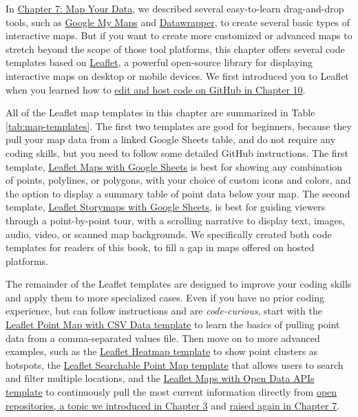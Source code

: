 \documentclass[
  english,
]{book}
\begin{document}
In \href{map.html}{Chapter 7: Map Your Data}, we described several easy-to-learn drag-and-drop tools, such as \href{mymaps.html}{Google My Maps} and \href{symbolmap-datawrapper.html}{Datawrapper}, to create several basic types of interactive maps. But if you want to create more customized or advanced maps to stretch beyond the scope of those tool platforms, this chapter offers several code templates based on \href{https://leafletjs.com}{Leaflet}, a powerful open-source library for displaying interactive maps on desktop or mobile devices. We first introduced you to Leaflet when you learned how to \href{github.html}{edit and host code on GitHub in Chapter 10}.

All of the Leaflet map templates in this chapter are summarized in Table \ref{tab:map-templates}. The first two templates are good for beginners, because they pull your map data from a linked Google Sheets table, and do not require any coding skills, but you need to follow some detailed GitHub instructions. The first template, \href{leaflet-maps-with-google-sheets.html}{Leaflet Maps with Google Sheets} is best for showing any combination of points, polylines, or polygons, with your choice of custom icons and colors, and the option to display a summary table of point data below your map. The second template, \href{leaflet-storymaps-with-google-sheets.html}{Leaflet Storymaps with Google Sheets}, is best for guiding viewers through a point-by-point tour, with a scrolling narrative to display text, images, audio, video, or scanned map backgrounds. We specifically created both code templates for readers of this book, to fill a gap in maps offered on hosted platforms.

The remainder of the Leaflet templates are designed to improve your coding skills and apply them to more specialized cases. Even if you have no prior coding experience, but can follow instructions and are \emph{code-curious}, start with the \href{leaflet-maps-with-csv.html}{Leaflet Point Map with CSV Data template} to learn the basics of pulling point data from a comma-separated values file. Then move on to more advanced examples, such as the \href{leaflet-heatmap.html}{Leaflet Heatmap template} to show point clusters as hotspots, the \href{leaflet-searchable-map.html}{Leaflet Searchable Point Map template} that allows users to search and filter multiple locations, and the \href{leaflet-maps-open-data-apis.html}{Leaflet Maps with Open Data APIs template} to continuously pull the most current information directly from \href{opendata.html}{open repositories, a topic we introduced in Chapter 3} and \href{map-socrata.html}{raised again in Chapter 7}.
\end{document}
